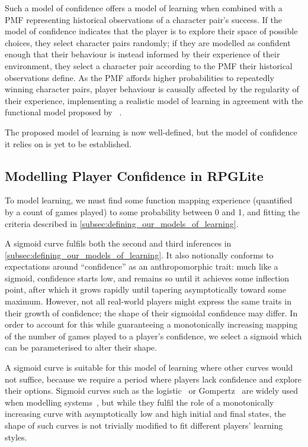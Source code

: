 Such a model of confidence offers a model of learning when combined with a PMF
representing historical observations of a character pair's success. If the model
of confidence indicates that the player is to explore their space of possible
choices, they select character pairs randomly; if they are modelled as confident
enough that their behaviour is instead informed by their experience of their
environment, they select a character pair according to the PMF their historical
observations define. As the PMF affords higher probabilities to repeatedly
winning character pairs, player behaviour is causally affected by the regularity
of their experience, implementing a realistic model of learning in agreement
with the functional model proposed by
\citeauthor{lachman1997learning}~\cite{lachman1997learning}.

The proposed model of learning is now well-defined, but the model of confidence
it relies on is yet to be established.

\subsection{Modelling Player Confidence in RPGLite}\label{subsec:confidence_model}

To model learning, we must find some function mapping experience (quantified by
a count of games played) to some probability between 0 and 1, and fitting the
criteria described in \cref{subsec:defining_our_models_of_learning}.

A sigmoid curve fulfils both the second and third inferences in
\cref{subsec:defining_our_models_of_learning}. It also notionally conforms to
expectations around ``confidence'' as an anthropomorphic trait: much like a
sigmoid, confidence starts low, and remains so until it achieves some inflection
point, after which it grows rapidly until tapering asymptotically toward some
maximum. However, not all real-world players might express the same traits in
their growth of confidence; the shape of their sigmoidal confidence may differ.
In order to account for this while guaranteeing a monotonically increasing
mapping of the number of games played to a player's confidence, we select a
sigmoid which can be parameterised to alter their shape.

A sigmoid curve is suitable for this model of learning where other curves would
not suffice, because we require a period where players lack confidence and
explore their options. Sigmoid curves such as the
logistic~\cite{verhulst1845loi} or Gompertz~\cite{gompertz1815curve} are widely
used when modelling systems~\cite{werker1997modelling}, but while they fulfil
the role of a monotonically increasing curve with asymptotically low and high
initial and final states, the shape of such curves is not trivially modified to
fit different players' learning styles.

